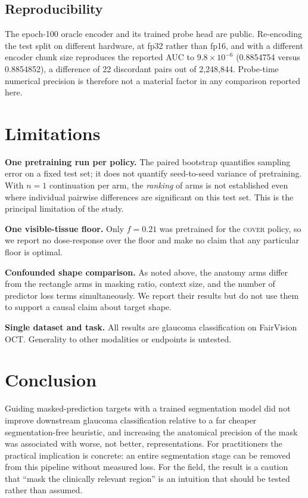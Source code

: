\documentclass{article}
\begin{document}
\subsection{Reproducibility}

The epoch-100 oracle encoder and its trained probe head are public. Re-encoding
the test split on different hardware, at fp32 rather than fp16, and with a
different encoder chunk size reproduces the reported AUC to
$9.8\times10^{-6}$ (0.8854754 versus 0.8854852), a difference of 22 discordant
pairs out of 2{,}248{,}844. Probe-time numerical precision is therefore not a
material factor in any comparison reported here.

\section{Limitations}

\textbf{One pretraining run per policy.} The paired bootstrap quantifies
sampling error on a fixed test set; it does not quantify seed-to-seed variance
of pretraining. With $n{=}1$ continuation per arm, the \emph{ranking} of arms is
not established even where individual pairwise differences are significant on
this test set. This is the principal limitation of the study.

\textbf{One visible-tissue floor.} Only $f{=}0.21$ was pretrained for the
\textsc{cover} policy, so we report no dose-response over the floor and make no
claim that any particular floor is optimal.

\textbf{Confounded shape comparison.} As noted above, the anatomy arms differ
from the rectangle arms in masking ratio, context size, and the number of
predictor loss terms simultaneously. We report their results but do not use
them to support a causal claim about target shape.

\textbf{Single dataset and task.} All results are glaucoma classification on
FairVision OCT. Generality to other modalities or endpoints is untested.

\section{Conclusion}

Guiding masked-prediction targets with a trained segmentation model did not
improve downstream glaucoma classification relative to a far cheaper
segmentation-free heuristic, and increasing the anatomical precision of the mask
was associated with worse, not better, representations. For practitioners the
practical implication is concrete: an entire segmentation stage can be removed
from this pipeline without measured loss. For the field, the result is a caution
that ``mask the clinically relevant region'' is an intuition that should be
tested rather than assumed.



\end{document}
